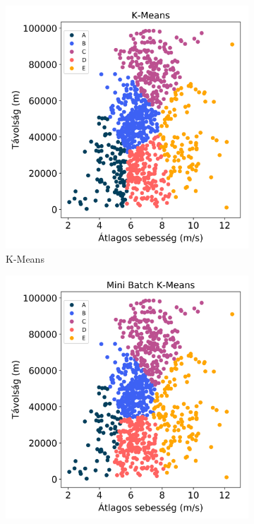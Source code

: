 \begin{figure}[!h]
	\centering
	\begin{subfigure}{.5\linewidth}
		\centering
		\includegraphics[width=\textwidth,keepaspectratio]{kepek/clustering/age_group_0_kmeans_results.png}
		\caption{K-Means}
		\label{subfig:clusteringAgeGroupNullKmeans}
	\end{subfigure}%
	\begin{subfigure}{.5\linewidth}
		\centering
		\includegraphics[width=\textwidth,keepaspectratio]{kepek/clustering/age_group_0_minibatch_results.png}

\end{subfigure}
\end{figure}
